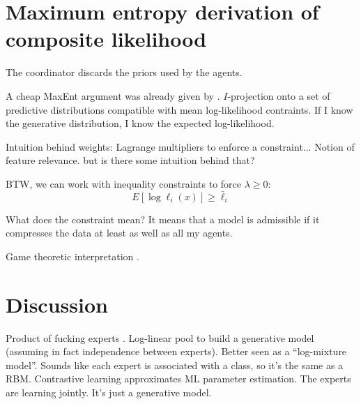 \documentclass[english]{scrartcl}
\begin{document}
\section{Maximum entropy derivation of composite likelihood}
\label{sec:maxent}

The coordinator discards the priors used by the agents. 

A cheap MaxEnt argument was already given by \cite{Wang-14}. $I$-projection onto a set of predictive distributions compatible with mean log-likelihood contraints. If I know the generative distribution, I know the expected log-likelihood.

Intuition behind weights: Lagrange multipliers to enforce a constraint... Notion of feature relevance. but is there some intuition behind that? 

BTW, we can work with inequality constraints to force $\lambda\geq 0$:
$$
E[\log \ell_i(x)] \geq \bar{\ell}_i
$$

What does the constraint mean? It means that a model is admissible if it compresses the data at least as well as all my agents.

Game theoretic interpretation \cite{Grunwald-04}.



\section{Discussion}
\label{sec:discussion}

{\color{red}Product of fucking experts \cite{Hinton-02}. Log-linear pool to build a generative model (assuming in fact independence between experts). Better seen as a ``log-mixture model''. Sounds like each expert is associated with a class, so it's the same as a RBM. Contrastive learning approximates ML parameter estimation. The experts are learning jointly. It's just a generative model.}
\end{document}
